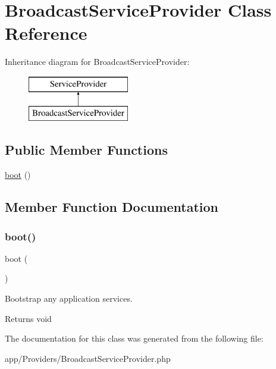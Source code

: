 \hypertarget{class_app_1_1_providers_1_1_broadcast_service_provider}{}\section{Broadcast\+Service\+Provider Class Reference}
\label{class_app_1_1_providers_1_1_broadcast_service_provider}
Inheritance diagram for Broadcast\+Service\+Provider\+:\begin{figure}[H]
\begin{center}
\leavevmode
\includegraphics[height=2.000000cm]{class_app_1_1_providers_1_1_broadcast_service_provider}
\end{center}
\end{figure}
\subsection*{Public Member Functions}
\begin{DoxyCompactItemize}
\item 
\mbox{\hyperlink{class_app_1_1_providers_1_1_broadcast_service_provider_a8814ea4b5beba763c570b4818980814e}{boot}} ()
\end{DoxyCompactItemize}


\subsection{Member Function Documentation}
\mbox{\label{class_app_1_1_providers_1_1_broadcast_service_provider_a8814ea4b5beba763c570b4818980814e}} 
\subsubsection{\texorpdfstring{boot()}{boot()}}
{\footnotesize\ttfamily boot (\begin{DoxyParamCaption}{ }\end{DoxyParamCaption})}

Bootstrap any application services.

\begin{DoxyReturn}{Returns}
void 
\end{DoxyReturn}


The documentation for this class was generated from the following file\+:\begin{DoxyCompactItemize}
\item 
app/\+Providers/Broadcast\+Service\+Provider.\+php\end{DoxyCompactItemize}
